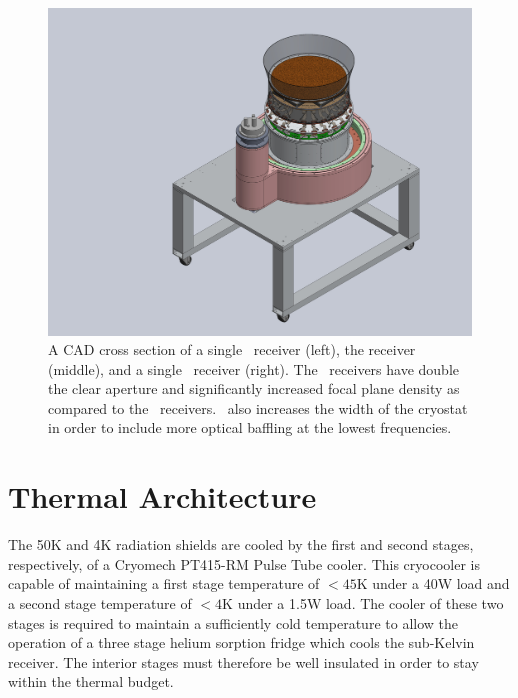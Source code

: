 \documentclass[]{spie}  %
\begin{document}
\begin{figure} [h]
	\begin{center}
		\includegraphics[scale=0.4]{base_on_lowboy.JPG}
	\end{center}
	\caption{A CAD cross section of a single \keckarray\ receiver (left), the
	 receiver (middle), and a single
	\biceparray\ receiver (right). The \biceparray\ receivers have double
	the clear aperture and significantly increased focal plane density as
	compared to the \keckarray\ receivers. \biceparray\ also increases the
	width of the cryostat in order to include more optical baffling at the
	lowest frequencies.}
	\label{fig:base}
\end{figure}


\section{Thermal Architecture}
\label{sec:thermal_architecture}

 The 50K and 4K radiation shields are cooled by the first
and second stages, respectively, of a Cryomech PT415-RM Pulse Tube cooler. This
cryocooler is capable of maintaining a first stage temperature of $<45$K under
a 40W load and a second stage temperature of $<4$K under a
1.5W load. The cooler of these two stages is required to maintain a
sufficiently cold temperature to allow the operation of a three stage helium
sorption fridge which cools the sub-Kelvin receiver. The interior stages must
therefore be well insulated in order to stay within the thermal budget.

\clearpage
\end{document}
